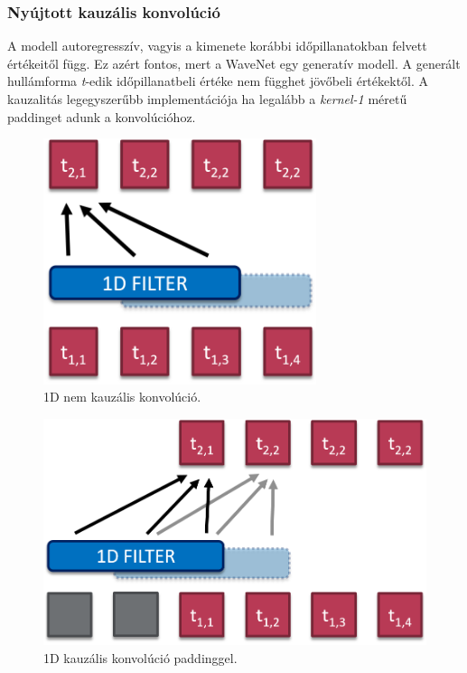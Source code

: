 \subsubsection{Nyújtott kauzális konvolúció}

A modell autoregresszív, vagyis a kimenete korábbi időpillanatokban felvett értékeitől függ. Ez azért fontos, mert a WaveNet egy generatív modell. A generált hullámforma \emph{t}-edik időpillanatbeli értéke nem függhet jövőbeli értékektől. A kauzalitás legegyszerűbb implementációja ha legalább a \emph{kernel-1} méretű paddinget adunk a konvolúcióhoz.

\begin{figure}[!ht]
	\centering
	\includegraphics[width=80mm, keepaspectratio]{figures/1d-conv.png}
	\caption{1D nem kauzális konvolúció.}
	\label{fig:1d_noncausal_conv}
\end{figure}

\begin{figure}[!ht]
	\centering
	\includegraphics[width=120mm, keepaspectratio]{figures/1d-causal-conv.png}
	\caption{1D kauzális konvolúció paddinggel.}
	\label{fig:1d_causal_conv}
\end{figure}

